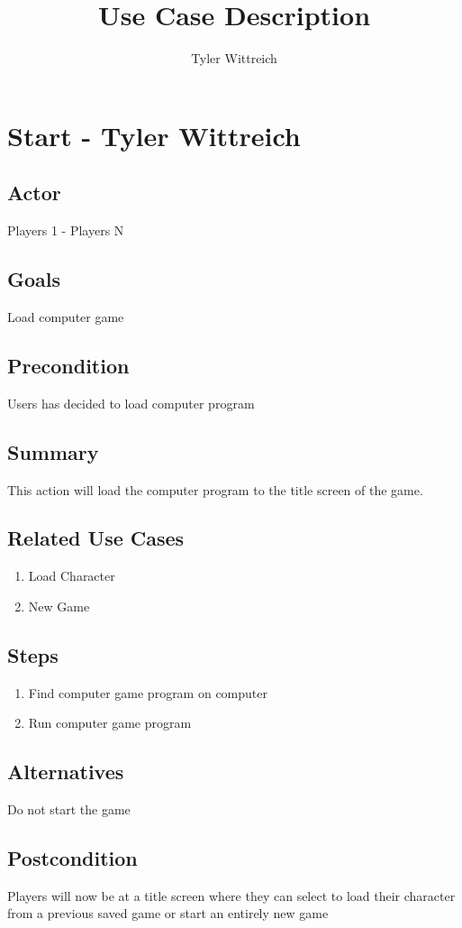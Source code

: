 \documentclass[10pt]{article}
\title{Use Case Description}
\author{Tyler Wittreich}
\begin{document}
    \section{Start - Tyler Wittreich}

		\subsection{Actor}
		Players 1 - Players N
		
		
		\subsection{Goals}
 		Load computer game 

		\subsection{Precondition}
 		Users has decided to load computer program 

		\subsection{Summary}
		This action will load the computer program to the title screen of the game.

		\subsection{Related Use Cases}
			 \begin{enumerate}
			   \item Load Character
			   \item New Game
			 \end{enumerate}
	

        \subsection{Steps}
			\begin{enumerate}
			\item Find computer game program on computer
			\item Run computer game program
			\end{enumerate}
			
		\subsection{Alternatives}
			Do not start the game 
			
		\subsection{Postcondition}
			Players will now be at a title screen where they can select to load their character from a previous saved game or start an entirely new game 
\end{document}
